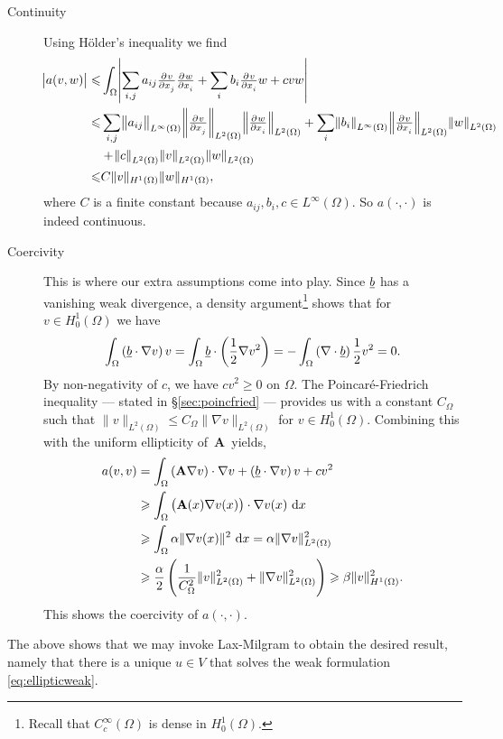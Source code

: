 \documentclass[thesis.tex]{subfiles}
\begin{document}
\begin{description}
  \item[Continuity]Using H\"older's inequality we find
    \begin{align*}
      \abs{a(v,w)} \leq &\int_\Omega \abs{\sum_{i,j} a_{ij} \pd{v}{x_j}\pd{w}{x_i}  + \sum_i b_i \pd{v}{x_i}w + cvw}\\
                   \leq &\sum_{i,j} \norm{ a_{ij}}_{L^\infty(\Omega)} \norm{ \pd{v}{x_j}}_{L^2(\Omega)} \norm{ \pd{w}{x_i}}_{L^2(\Omega)} + \sum_i \norm{b_i}_{L^\infty(\Omega)} \norm{\pd{v}{x_i}}_{L^2(\Omega)} \norm{w}_{L^2(\Omega)} \\
                   &+ \norm{c}_{L^2(\Omega)} \norm{v}_{L^2(\Omega)} \norm{w}_{L^2(\Omega)} \\
                   \leq &C \|v\|_{H^1(\Omega)} \|w\|_{H^1(\Omega)},
    \end{align*}
    where $C$ is a finite constant because $a_{ij}, b_i, c \in L^\infty(\Omega)$. So $a(\cdot,\cdot)$ is indeed continuous.
  \item[Coercivity] This is where our extra assumptions come into play. Since $\underline{b}$ has a vanishing weak divergence, a density argument\footnote{Recall that $C_c^\infty(\Omega)$ is dense in $H_0^1(\Omega)$.} shows that for $v \in H_0^1(\Omega)$ we have
    \[
      \int_\Omega \left(\underline{b} \cdot \nabla v\right)v  = \int_\Omega \underline{b} \cdot \left({1 \over 2} \nabla v^2\right) = - \int_\Omega \left(\nabla \cdot \underline{b} \right) {1 \over 2} v^2 = 0.
    \]
    By non-negativity of $c$, we have $cv^2 \geq 0$ on $\Omega$. 
    The Poincar\'e-Friedrich  inequality --- stated in \S\ref{sec:poincfried} --- provides us with a constant $C_\Omega$ such that ${\|v\|_{L^2(\Omega)} \leq C_\Omega \|\nabla v\|_{L^2(\Omega)}}$ for $v \in H_0^1(\Omega)$. Combining this with the uniform ellipticity of~$\mathbf{A}$~yields,
    \begin{align*}
      a(v,v) &= \int_\Omega \left(\mathbf{A} \nabla v\right) \cdot \nabla v + \left(\v{b} \cdot \nabla v\right)v + cv^2 \\
      &\geq  \int_\Omega \left(\mathbf{A}(x) \nabla v(x)\right) \cdot \nabla v(x)\, \dif x \\
             &\geq  \int_\Omega \alpha \|\nabla v(x)\|^2\, \dif x = \alpha \|\nabla v\|^2_{L^2(\Omega)}\\
             &\geq \frac{\alpha}{2} \left(\frac{1}{C^2_\Omega} \|v\|^2_{L^2(\Omega)} + \|\nabla v\|^2_{L^2(\Omega)}\right) \geq \beta \|v\|^2_{H^1(\Omega)}.
    \end{align*}
    This shows the coercivity of $a(\cdot, \cdot)$.
\end{description}
The above shows that we may invoke Lax-Milgram to obtain the desired result,
namely that there is a unique $u \in V$ that solves the weak formulation \eqref{eq:ellipticweak}. 
\end{document}
